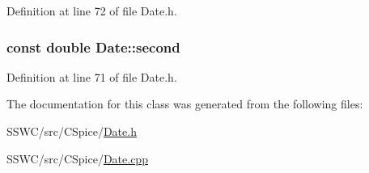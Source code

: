 Definition at line 72 of file Date.\+h.

\hypertarget{class_date_ae6f7ae7f25f297a2edbf3145384fc94b}{
\subsubsection[{second}]{\setlength{\rightskip}{0pt plus 5cm}const double Date\+::second\hspace{0.3cm}{\ttfamily [static]}}}\label{class_date_ae6f7ae7f25f297a2edbf3145384fc94b}


Definition at line 71 of file Date.\+h.



The documentation for this class was generated from the following files\+:\begin{DoxyCompactItemize}
\item 
S\+S\+W\+C/src/\+C\+Spice/\hyperlink{_date_8h}{Date.\+h}\item 
S\+S\+W\+C/src/\+C\+Spice/\hyperlink{_date_8cpp}{Date.\+cpp}\end{DoxyCompactItemize}
